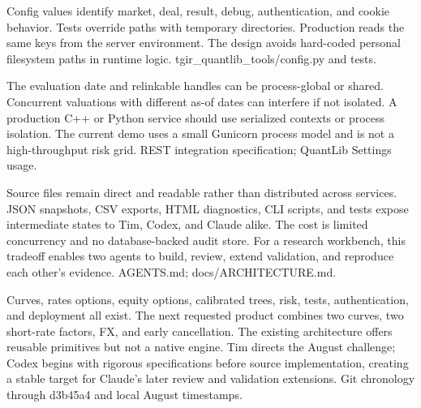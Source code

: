 {Config values identify market, deal, result, debug, authentication, and cookie behavior.}
{Tests override paths with temporary directories.}
{Production reads the same keys from the server environment.}
{The design avoids hard-coded personal filesystem paths in runtime logic.}
{tgir\_quantlib\_tools/config.py and tests.}

{The evaluation date and relinkable handles can be process-global or shared.}
{Concurrent valuations with different as-of dates can interfere if not isolated.}
{A production C++ or Python service should use serialized contexts or process isolation.}
{The current demo uses a small Gunicorn process model and is not a high-throughput risk grid.}
{REST integration specification; QuantLib Settings usage.}

{Source files remain direct and readable rather than distributed across services.}
{JSON snapshots, CSV exports, HTML diagnostics, CLI scripts, and tests expose intermediate states to Tim, Codex, and Claude alike.}
{The cost is limited concurrency and no database-backed audit store.}
{For a research workbench, this tradeoff enables two agents to build, review, extend validation, and reproduce each other's evidence.}
{AGENTS.md; docs/ARCHITECTURE.md.}

{Curves, rates options, equity options, calibrated trees, risk, tests, authentication, and deployment all exist.}
{The next requested product combines two curves, two short-rate factors, FX, and early cancellation.}
{The existing architecture offers reusable primitives but not a native engine.}
{Tim directs the August challenge; Codex begins with rigorous specifications before source implementation, creating a stable target for Claude's later review and validation extensions.}
{Git chronology through d3b45a4 and local August timestamps.}
